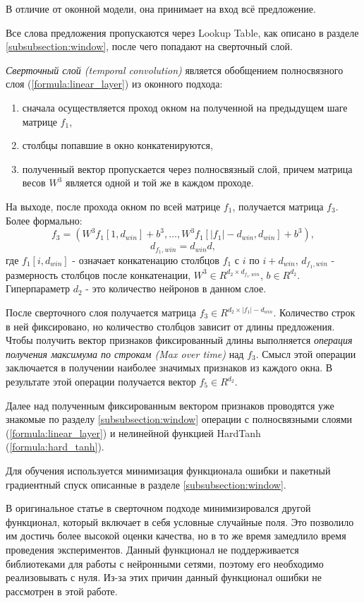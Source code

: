   В отличие от оконной модели, она принимает на вход всё предложение.

  Все слова предложения пропускаются через Lookup Table, как описано в разделе
  \ref{subsubsection:window}, после чего попадают на сверточный слой.

  \textit{Сверточный слой (temporal convolution)} является обобщением
  полносвязного слоя (\ref{formula:linear_layer}) из оконного подхода:
  \begin{enumerate}
    \item сначала осуществляется проход окном на полученной на предыдущем шаге матрице $f_1$,
    \item столбцы попавшие в окно конкатенируются,
    \item полученный вектор пропускается через полносвязный слой,
    причем матрица весов $W^3$ является одной и той же в каждом проходе.
  \end{enumerate}
  На выходе, после прохода окном по всей матрице $f_1$, получается матрица $f_3$.
  Более формально:
  \[
  f_3 =(W^3 f_1[1, d_{win}] + b^3,\ldots,W^3 f_1[|f_1| - d_{win}, d_{win}] + b^3),
  \]
  \[
  d_{f_1, win} = d_{win} d,
  \]
  где $f_1[i, d_{win}]$ - означает конкатенацию столбцов $f_1$ с $i$ по $i + d_{win}$,
  $d_{f_1, win}$ - размерность столбцов после конкатенации,
  $W^3 \in R^{d_{2} \times d_{f_1, win}}$, $b \in R^{d_2}$. Гиперпараметр $d_{2}$ -
  это количество нейронов в данном слое.

  После сверточного слоя получается матрица $f_3 \in R^{d_2\times |f_1| - d_{win}}$.
  Количество строк в ней фиксировано, но количество столбцов зависит от длины предложения.
  Чтобы получить вектор признаков фиксированный длины выполняется \textit{операция
  получения максимума по строкам (Max over time)} над $f_3$.
  Смысл этой операции заключается в получении наиболее значимых признаков из каждого окна.
  В результате этой операции получается вектор $f_5 \in R^{d_2}$.

  Далее над полученным фиксированным вектором признаков проводятся уже
  знакомые по разделу \ref{subsubsection:window}
  операции с полносвязными слоями (\ref{formula:linear_layer}) и
  нелинейной функцией HardTanh (\ref{formula:hard_tanh}).

  Для обучения используется минимизация функционала ошибки и пакетный градиентный
  спуск описанные в разделе \ref{subsubsection:window}.

  В оригинальное статье \citep{collobert2011natural} в сверточном подходе
  минимизировался другой функционал, который включает в себя условные случайные поля.
  Это позволило им достичь более высокой оценки качества, но в то же время замедлило
  время проведения экспериментов. Данный функционал не поддерживается библиотеками для
  работы с нейронными сетями, поэтому его необходимо реализовывать с нуля.
  Из-за этих причин данный функционал ошибки не рассмотрен в этой работе.

